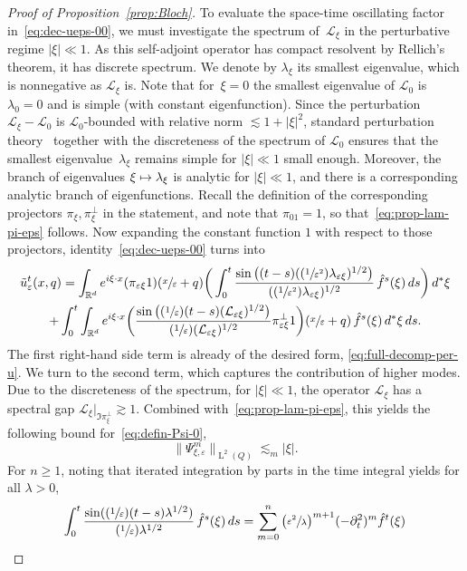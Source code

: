 \documentclass[10pt]{amsart}
\newcommand{\Psfrac}[2]{(\sfrac{#1}{#2})}
\newcommand\mto{\mathchoice{\longmapsto}{\mapsto}{\mapsto}{\mapsto}}
\theoremstyle{plain}
\theoremstyle{definition}
\numberwithin{equation}{section}
\newcommand{\e}{\varepsilon}
\newcommand{\Lc}{\mathcal{L}}
\newcommand{\R}{\mathbb R}
\newcommand{\Ld}{\operatorname{L}}
\begin{document}
\begin{proof}[Proof of Proposition~\ref{prop:Bloch}]
To evaluate the space-time oscillating factor in~\eqref{eq:dec-ueps-00}, we must investigate the spectrum of~$\Lc_\xi$ in the perturbative regime $|\xi|\ll1$. As this self-adjoint operator has compact resolvent by Rellich's theorem, it has discrete spectrum.
We denote by $\lambda_\xi$ its smallest eigenvalue, which is nonnegative as $\Lc_\xi$ is.
Note that for~\mbox{$\xi=0$} the smallest eigenvalue of $\Lc_0$ is $\lambda_0=0$ and is simple (with constant eigenfunction).
Since the perturbation $\Lc_\xi-\Lc_0$ is $\Lc_0$-bounded with relative norm $\lesssim1+|\xi|^2$, standard perturbation theory~\cite{Kato} together with the discreteness of the spectrum of $\Lc_0$ ensures that the smallest eigenvalue~$\lambda_\xi$ remains simple for $|\xi|\ll1$ small enough. Moreover, the branch of eigenvalues $\xi\mto \lambda_\xi$ is analytic for $|\xi|\ll1$, and there is a corresponding analytic branch of eigenfunctions.
Recall the definition of the corresponding projectors $\pi_\xi,\pi_\xi^\bot$ in the statement, and note that $\pi_01=1$, {so that}~\eqref{eq:prop-lam-pi-eps} follows.
Now expanding the constant function $1$ with respect to those projectors, identity~\eqref{eq:dec-ueps-00} turns into
\begin{multline}\label{eq:dec-ueps-0}
\tilde u_\e^t(x,q)=\int_{\R^d}e^{i\xi\cdot x}(\pi_{\e\xi}1)(\sfrac x\e+q)\bigg(\int_0^t \frac{\sin\big((t-s)(\Psfrac1{\e^2}\lambda_{\e \xi})^{1/2}\big)}{(\Psfrac1{\e^2}\lambda_{\e \xi})^{1/2}}\,\hat f^s(\xi)\,ds\bigg)\,d^*\xi\\
+\int_0^t\int_{\R^d}e^{i\xi\cdot x} \bigg(\frac{\sin\big(\Psfrac1\e(t-s)(\Lc_{\e \xi})^{1/2}\big)}{\Psfrac1\e(\Lc_{\e \xi})^{1/2}}\pi_{\e\xi}^\bot1\bigg)(\sfrac x\e+q)\,\hat f^s(\xi)\,d^*\xi\,ds.
\end{multline}
The first right-hand side term is already of the desired form, \cf \eqref{eq:full-decomp-per-u}.
We turn to the second term, which captures the contribution of higher modes.
Due to the discreteness of the spectrum, for $|\xi|\ll1$, the operator $\Lc_\xi$ has a spectral gap $\Lc_\xi|_{\Im\pi_{\xi}^\bot}\gtrsim1$. Combined with~\eqref{eq:prop-lam-pi-eps}, this yields the following bound for~\eqref{eq:defin-Psi-0},
\[\|\Psi_{\xi,\e}^m\|_{\Ld^2( Q)}\lesssim_m|\xi|.\]
For $n\ge1$, noting that iterated integration by parts in the time integral yields for all $\lambda>0$,
\begin{multline*}
\int_0^t\frac{\sin(\Psfrac1\e(t-s)\lambda^{1/2})}{\Psfrac1\e \lambda^{1/2}}\,\hat f^s(\xi)\,ds=\sum_{m=0}^{n} \big(\sfrac{\e^2}{\lambda}\big)^{m+1}(-\partial_t^2)^m\hat f^t(\xi)\\

\end{multline*}
\end{proof}
\end{document}
